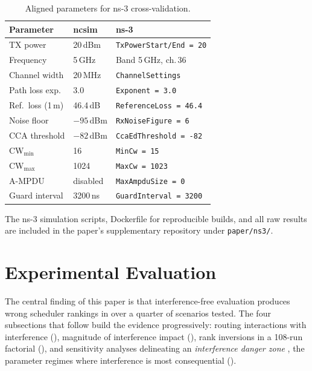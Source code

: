 \documentclass[conference]{IEEEtran}
\begin{document}
\begin{table}[t]
\centering
\caption{Aligned parameters for ns-3 cross-validation.}
\label{tab:ns3_params}
\begin{tabular}{@{}lll@{}}
\toprule
\textbf{Parameter} & \textbf{ncsim} & \textbf{ns-3} \\
\midrule
TX power & 20\,dBm & \texttt{TxPowerStart/End = 20} \\
Frequency & 5\,GHz & Band 5\,GHz, ch.\,36 \\
Channel width & 20\,MHz & \texttt{ChannelSettings} \\
Path loss exp. & 3.0 & \texttt{Exponent = 3.0} \\
Ref.\ loss (1\,m) & 46.4\,dB & \texttt{ReferenceLoss = 46.4} \\
Noise floor & $-95$\,dBm & \texttt{RxNoiseFigure = 6} \\
CCA threshold & $-82$\,dBm & \texttt{CcaEdThreshold = -82} \\
CW$_{\min}$ & 16 & \texttt{MinCw = 15} \\
CW$_{\max}$ & 1024 & \texttt{MaxCw = 1023} \\
A-MPDU & disabled & \texttt{MaxAmpduSize = 0} \\
Guard interval & 3200\,ns & \texttt{GuardInterval = 3200} \\
\bottomrule
\end{tabular}
\end{table}

The ns-3 simulation scripts, Dockerfile for reproducible builds, and all
raw results are included in the paper's supplementary repository under
\texttt{paper/ns3/}.


\section{Experimental Evaluation}
\label{sec:eval}

The central finding of this paper is that interference-free evaluation
produces wrong scheduler rankings in over a quarter of scenarios tested.
The four subsections that follow build the evidence progressively:
routing interactions with interference (),
magnitude of interference impact (),
rank inversions in a 108-run factorial (),
and sensitivity analyses delineating an \emph{interference danger zone}
, the parameter regimes where interference is most consequential
().
\end{document}
